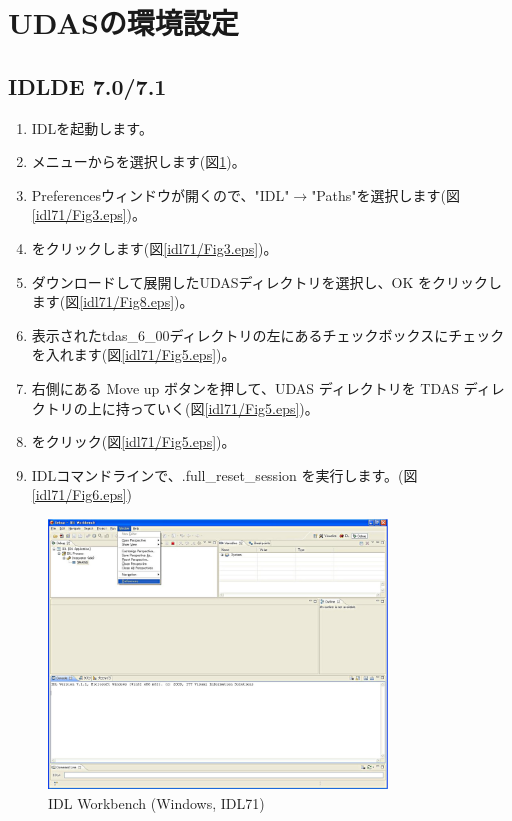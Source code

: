 \documentclass[a4j]{jbook}
\begin{document}
\section{UDASの環境設定}

\subsection{IDLDE 7.0/7.1}

\begin{enumerate}
\item IDLを起動します。
\item {}メニューからを選択します(図\ref{idl71/Fig2.eps})。
\item Preferencesウィンドウが開くので、"IDL"$\rightarrow$"Paths"を選択します(図\ref{idl71/Fig3.eps})。
\item {} をクリックします(図\ref{idl71/Fig3.eps})。
\item ダウンロードして展開したUDASディレクトリを選択し、OK をクリックします(図\ref{idl71/Fig8.eps})。
\item 表示されたtdas\_6\_00ディレクトリの左にあるチェックボックスにチェックを入れます(図\ref{idl71/Fig5.eps})。
\item 右側にある Move up ボタンを押して、UDAS ディレクトリを TDAS ディレクトリの上に持っていく(図\ref{idl71/Fig5.eps})。
\item {}をクリック(図\ref{idl71/Fig5.eps})。
\item IDLコマンドラインで、.full\_reset\_session  を実行します。(図\ref{idl71/Fig6.eps})
\end{enumerate}


\begin{figure}[H]
\begin{center}
\includegraphics[width=9cm]{fig_idl71/Fig2.eps}
\caption{IDL Workbench (Windows, IDL71)}
\label{idl71/Fig2.eps}
\end{center}
\end{figure}
\end{document}
